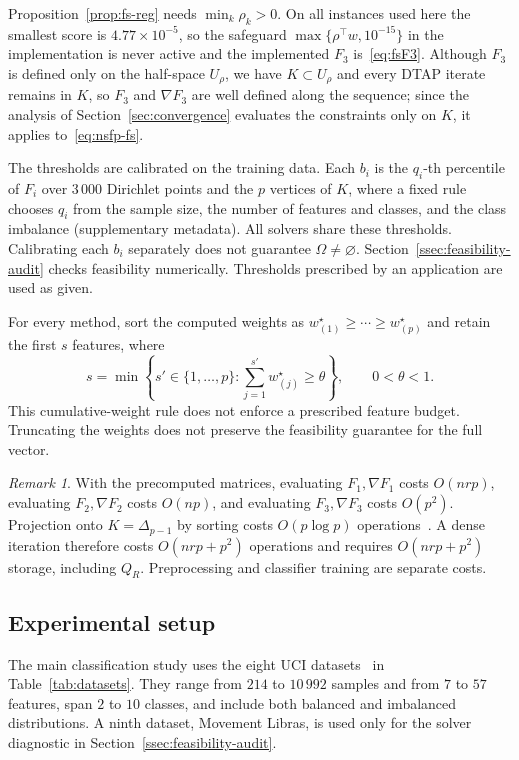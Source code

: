 \documentclass[]{interact}
\theoremstyle{plain}
\theoremstyle{definition}
\theoremstyle{remark}
\newtheorem{remark}{Remark}
\begin{document}
Proposition~\ref{prop:fs-reg} needs $\min_k\rho_k>0$. On all instances used here the smallest score is $4.77\times10^{-5}$, so the safeguard $\max\{\rho^\top w,10^{-15}\}$ in the implementation is never active and the implemented $F_3$ is~\eqref{eq:fsF3}. Although $F_3$ is defined only on the half-space $U_\rho$, we have $K\subset U_\rho$ and every DTAP iterate remains in $K$, so $F_3$ and $\nabla F_3$ are well defined along the sequence; since the analysis of Section~\ref{sec:convergence} evaluates the constraints only on $K$, it applies to~\eqref{eq:nsfp-fs}.

The thresholds are calibrated on the training data. Each $b_i$ is the $q_i$-th percentile of $F_i$ over $3\,000$ Dirichlet points and the $p$ vertices of $K$, where a fixed rule chooses $q_i$ from the sample size, the number of features and classes, and the class imbalance (supplementary metadata). All solvers share these thresholds. Calibrating each $b_i$ separately does not guarantee $\Omega\ne\varnothing$. Section~\ref{ssec:feasibility-audit} checks feasibility numerically. Thresholds prescribed by an application are used as given.

For every method, sort the computed weights as $w^\star_{(1)}\ge\cdots\ge w^\star_{(p)}$ and retain the first $s$ features, where
\begin{equation}\label{eq:thetaRule}
s=\min\left\{s'\in\{1,\ldots,p\}:\sum_{j=1}^{s'}w^\star_{(j)}\ge\theta\right\},\qquad 0<\theta<1.
\end{equation}
This cumulative-weight rule does not enforce a prescribed feature budget. Truncating the weights does not preserve the feasibility guarantee for the full vector.

\begin{remark}\label{rem:fs-cost}
With the precomputed matrices, evaluating $F_1,\nabla F_1$ costs $O(nrp)$, evaluating $F_2,\nabla F_2$ costs $O(np)$, and evaluating $F_3,\nabla F_3$ costs $O(p^2)$. Projection onto $K=\Delta_{p-1}$ by sorting costs $O(p\log p)$ operations~\citep{condat2016simplex}. A dense iteration therefore costs $O(nrp+p^2)$ operations and requires $O(nrp+p^2)$ storage, including $Q_R$. Preprocessing and classifier training are separate costs.
\end{remark}

\subsection{Experimental setup}\label{ssec:setup}\label{sssec:datasets}
The main classification study uses the eight UCI datasets~\citep{kelly2023uci} in Table~\ref{tab:datasets}. They range from $214$ to $10\,992$ samples and from $7$ to $57$ features, span $2$ to $10$ classes, and include both balanced and imbalanced distributions. A ninth dataset, Movement Libras, is used only for the solver diagnostic in Section~\ref{ssec:feasibility-audit}.
\end{document}
